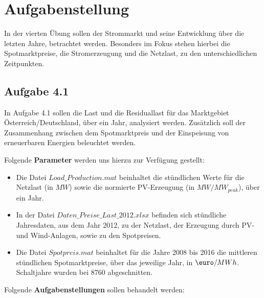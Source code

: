\documentclass[a4paper,12pt]{article}
\begin{document}
	

	\newpage
	\tableofcontents

	\newpage
	\section{Aufgabenstellung}
	\label{sec:Aufgabenstellung}
	In der vierten Übung sollen der Strommarkt und seine Entwicklung über die letzten Jahre, betrachtet werden. Besonders im Fokus stehen hierbei die Spotmarktpreise, die Stromerzeugung und die Netzlast, zu den unterschiedlichen Zeitpunkten.
	\subsection{Aufgabe 4.1}
	\label{sec:Aufgabenstellung41}
	In Aufgabe 4.1 sollen die Last und die Residuallast für das Marktgebiet Österreich/Deutschland, über ein Jahr, analysiert werden. Zusätzlich soll der Zusammenhang zwischen dem Spotmarktpreis und der Einspeisung von erneuerbaren Energien beleuchtet werden.\\ \par
	Folgende \textbf{Parameter} werden uns hierzu zur Verfügung gestellt:
	\begin{itemize}
		\item Die Datei $Load\_Production.mat$ beinhaltet die stündlichen Werte für die Netzlast (in $MW$) sowie die normierte PV-Erzeugung (in $MW/MW_{peak}$), über ein Jahr.
		\item In der Datei $Daten\_Preise\_Last\_2012.xlsx$ befinden sich stündliche Jahresdaten, aus dem Jahr 2012, zu der Netzlast, der Erzeugung durch PV- und Wind-Anlagen, sowie zu den Spotpreisen.
		\item Die Datei $Spotpreis.mat$ beinhaltet für die Jahre 2008 bis 2016 die mittleren stündlichen Spotmarktpreise, über das jeweilige Jahr, in $\mbox{\euro}/MWh$. Schaltjahre wurden bei $8760$ abgeschnitten.
	\end{itemize}
	\noindent Folgende \textbf{Aufgabenstellungen} sollen behandelt werden:
\end{document}
